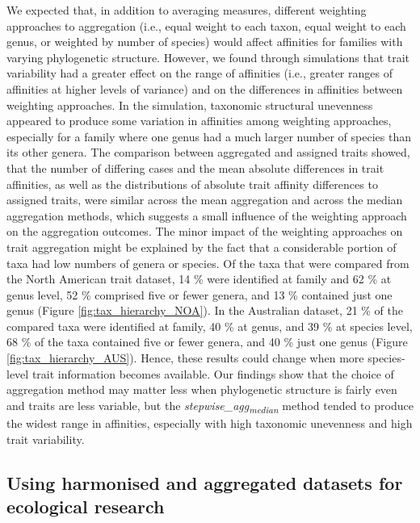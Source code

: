 \documentclass[12pt]{article}
\begin{document}
We expected that, in addition to averaging measures, different weighting approaches to aggregation (i.e., equal weight to each taxon, equal weight to each genus, or weighted by number of species) would affect affinities for families with varying phylogenetic structure. However, we found through simulations that trait variability had a greater effect on the range of affinities (i.e., greater ranges of affinities at higher levels of variance) and on the differences in affinities between weighting approaches. In the simulation, taxonomic structural unevenness appeared to produce some variation in affinities among weighting approaches, especially for a family where one genus had a much larger number of species than its other genera. The comparison between aggregated and assigned traits showed, that the number of differing cases and the mean absolute differences in trait affinities, as well as the distributions of absolute trait affinity differences to assigned traits, were similar across the mean aggregation and across the median aggregation methods, which suggests a small influence of the weighting approach on the aggregation outcomes. The minor impact of the weighting approaches on trait aggregation might be explained by the fact that a considerable portion of taxa had low numbers of genera or species. Of the taxa that were compared from the North American trait dataset, 14 \% were identified at family and 62 \% at genus level, 52 \% comprised five or fewer genera, and 13 \% contained just one genus (Figure \ref{fig:tax_hierarchy_NOA}). In the Australian dataset, 21 \% of the compared taxa were identified at family, 40 \% at genus, and 39 \% at species level, 68 \% of the taxa contained five or fewer genera, and 40 \% just one genus (Figure \ref{fig:tax_hierarchy_AUS}). Hence, these results could change when more species-level trait information becomes available. Our findings show that the choice of aggregation method may matter less when phylogenetic structure is fairly even and traits are less variable, but the \textit{stepwise\_agg\textsubscript{median}} method tended to produce the widest range in affinities, especially with high taxonomic unevenness and high trait variability. 

\subsection*{Using harmonised and aggregated datasets for ecological research}
\end{document}
